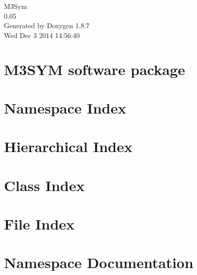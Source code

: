 \documentclass[twoside]{book}
\newcommand{\+}{\discretionary{\mbox{\scriptsize$\hookleftarrow$}}{}{}}
\newcommand{\clearemptydoublepage}{%
  \newpage{\pagestyle{empty}\cleardoublepage}%
}
\begin{document}
\hypersetup{pageanchor=false,
             bookmarks=true,
             bookmarksnumbered=true,
             pdfencoding=unicode
            }
\begin{titlepage}
\vspace*{7cm}
\begin{center}%
{\Large M3\+Sym \\[1ex]\large 0.\+05 }\\
\vspace*{1cm}
{\large Generated by Doxygen 1.8.7}\\
\vspace*{0.5cm}
{\small Wed Dec 3 2014 14:56:40}\\
\end{center}
\end{titlepage}
\clearemptydoublepage
\tableofcontents
\clearemptydoublepage
{}
\hypersetup{pageanchor=true}

\chapter{M3\+S\+Y\+M software package}
\label{index}\hypertarget{index}{}
\chapter{Namespace Index}

\chapter{Hierarchical Index}

\chapter{Class Index}

\chapter{File Index}

\chapter{Namespace Documentation}



\end{document}
